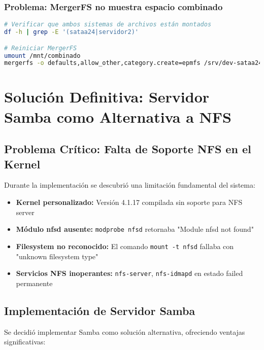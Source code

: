 \documentclass[12pt, a4paper]{article}
\begin{document}
\subsubsection{Problema: MergerFS no muestra espacio combinado}
\begin{lstlisting}[language=bash, caption=Solución para MergerFS]
# Verificar que ambos sistemas de archivos están montados
df -h | grep -E '(sataa24|servidor2)'

# Reiniciar MergerFS
umount /mnt/combinado
mergerfs -o defaults,allow_other,category.create=epmfs /srv/dev-sataa24:/mnt/servidor2-remoto /mnt/combinado
\end{lstlisting}

\clearpage
\section{Solución Definitiva: Servidor Samba como Alternativa a NFS}
\label{sec:solucion_samba}

\subsection{Problema Crítico: Falta de Soporte NFS en el Kernel}
\label{subsec:problema_kernel_nfs}

Durante la implementación se descubrió una limitación fundamental del sistema:

\begin{itemize}
    \item \textbf{Kernel personalizado:} Versión 4.1.17 compilada sin soporte para NFS server
    \item \textbf{Módulo nfsd ausente:} \texttt{modprobe nfsd} retornaba "Module nfsd not found"
    \item \textbf{Filesystem no reconocido:} El comando \texttt{mount -t nfsd} fallaba con "unknown filesystem type"
    \item \textbf{Servicios NFS inoperantes:} \texttt{nfs-server}, \texttt{nfs-idmapd} en estado failed permanente
\end{itemize}

\subsection{Implementación de Servidor Samba}
\label{subsec:implementacion_samba}

Se decidió implementar Samba como solución alternativa, ofreciendo ventajas significativas:
\end{document}
